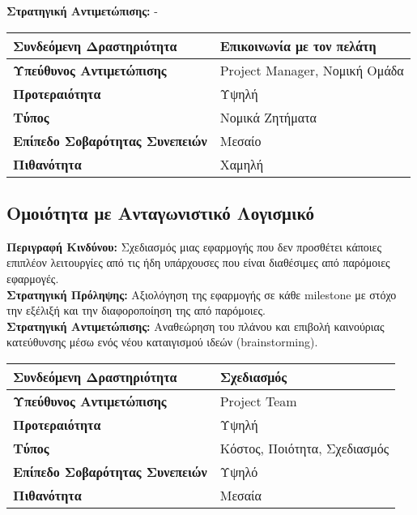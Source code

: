 \documentclass{article}
\newcommand\T{\rule{0pt}{2.6ex}}       %
\newcommand\B{\rule[-1.2ex]{0pt}{0pt}}
\begin{document}
\textbf{Στρατηγική Αντιμετώπισης:} -\\
 
 \begin{center}
     \begin{tabular}{|l|l|}
     \hline
      \textbf{Συνδεόμενη Δραστηριότητα}   & Επικοινωνία με τον πελάτη \T\B \\ 
      \hline
      \textbf{Υπεύθυνος Αντιμετώπισης} & Project Manager, Νομική Ομάδα \T\B \\
      \hline
      \textbf{Προτεραιότητα} & Υψηλή \T\B \\
      \hline
      \textbf{Τύπος} & Νομικά Ζητήματα \T\B \\
      \hline
      \textbf{Επίπεδο Σοβαρότητας Συνεπειών} & Μεσαίο \T\B \\
      \hline
      \textbf{Πιθανότητα} & Χαμηλή \T\B \\
      \hline
     \end{tabular}
 \end{center}

\subsection{Ομοιότητα με Ανταγωνιστικό Λογισμικό}

\textbf{Περιγραφή Κινδύνου:} Σχεδιασμός μιας εφαρμογής που δεν προσθέτει κάποιες επιπλέον
λειτουργίες από τις ήδη υπάρχουσες που είναι διαθέσιμες από παρόμοιες εφαρμογές.\\

\textbf{Στρατηγική Πρόληψης:} Αξιολόγηση της εφαρμογής σε κάθε milestone με στόχο την
εξέλιξή και την διαφοροποίηση της από παρόμοιες.\\


\textbf{Στρατηγική Αντιμετώπισης:} Αναθεώρηση του πλάνου και επιβολή καινούριας κατεύθυνσης μέσω ενός νέου καταιγισμού ιδεών (brainstorming).\\
 
 \begin{center}
     \begin{tabular}{|l|l|}
     \hline
      \textbf{Συνδεόμενη Δραστηριότητα}   & Σχεδιασμός \T\B \\ 
      \hline
      \textbf{Υπεύθυνος Αντιμετώπισης} & Project Team \T\B \\
      \hline
      \textbf{Προτεραιότητα} & Υψηλή \T\B \\
      \hline
      \textbf{Τύπος} & Κόστος, Ποιότητα, Σχεδιασμός \T\B \\
      \hline
      \textbf{Επίπεδο Σοβαρότητας Συνεπειών} & Υψηλό \T\B \\
      \hline
      \textbf{Πιθανότητα} & Μεσαία \T\B \\
      \hline
     \end{tabular}
 \end{center}
\end{document}
